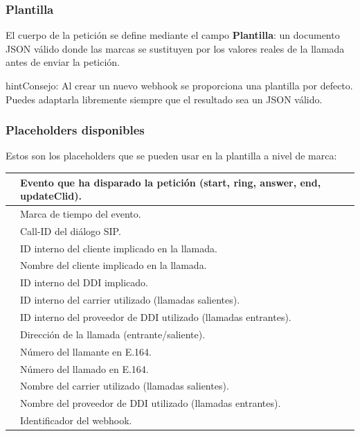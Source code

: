 \documentclass[letterpaper,10pt,spanish]{sphinxmanual}
\begin{document}
\subsubsection{Plantilla}
\label{administration_portal/brand/calls/webhooks:template}
El cuerpo de la petición  se define mediante el campo \textbf{Plantilla}: un documento JSON válido donde las marcas  se sustituyen por los valores reales de la llamada antes de enviar la petición.

\begin{notice}{hint}{Consejo:}
Al crear un nuevo webhook se proporciona una plantilla por defecto. Puedes adaptarla libremente siempre que el resultado sea un JSON válido.
\end{notice}


\subsubsection{Placeholders disponibles}
\label{administration_portal/brand/calls/webhooks:available-placeholders}
Estos son los placeholders que se pueden usar en la plantilla a nivel de marca:

\noindent\begin{tabulary}{\linewidth}{|L|L|}
\hline

&
Evento que ha disparado la petición (start, ring, answer, end, updateClid).
\\
\hline
{}
&
Marca de tiempo del evento.
\\
\hline
{}
&
Call-ID del diálogo SIP.
\\
\hline
{}
&
ID interno del cliente implicado en la llamada.
\\
\hline
{}
&
Nombre del cliente implicado en la llamada.
\\
\hline
{}
&
ID interno del DDI implicado.
\\
\hline
{}
&
ID interno del carrier utilizado (llamadas salientes).
\\
\hline
{}
&
ID interno del proveedor de DDI utilizado (llamadas entrantes).
\\
\hline
{}
&
Dirección de la llamada (entrante/saliente).
\\
\hline
{}
&
Número del llamante en E.164.
\\
\hline
{}
&
Número del llamado en E.164.
\\
\hline
{}
&
Nombre del carrier utilizado (llamadas salientes).
\\
\hline
{}
&
Nombre del proveedor de DDI utilizado (llamadas entrantes).
\\
\hline
{}
&
Identificador del webhook.
\\
\hline\end{tabulary}
\end{document}
